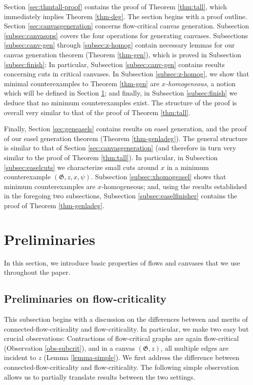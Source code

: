 \documentclass{article}
\newcommand\g{\mathfrak{G}}
\begin{document}
Section \ref{sec:thmtall-proof} contains the proof of Theorem
\ref{thm:tall}, which immediately implies Theorem \ref{thm-deg}. The section
begins with a proof outline. Section \ref{sec:canvasgeneration} concerns
flow-critical canvas generation. Subsection \ref{subsec:canvasops} covers the
four operations for generating canvases.  Subsections \ref{subsec:canv-gen}
through \ref{subsec:z-homog} contain necessary lemmas for our canvas generation
theorem (Theorem \ref{thm-gen}), which is proved in Subsection
\ref{subsec:finish}: In particular, Subsection \ref{subsec:canv-gen} contains
results concerning cuts in critical canvases. In Subsection
\ref{subsec:z-homog}, we show that minimal counterexamples to Theorem
\ref{thm-gen} are \emph{$x$-homogeneous}, a notion which will be defined in
Section \ref{sec:preliminaries}; and finally, in Subsection \ref{subsec:finish}
we deduce that no minimum counterexamples exist. The structure of the proof is
overall very similar to that of the proof of Theorem \ref{thm:tall}. 

Finally,
Section \ref{sec:geneasels} contains results on easel generation, and the proof
of our easel generation theorem (Theorem \ref{thm-genladeg}). The general
structure is similar to that of Section \ref{sec:canvasgeneration} (and
therefore in turn very similar to the proof of Theorem \ref{thm:tall}). In
particular, in Subsection \ref{subsec:easelcuts} we characterize small cuts
around $x$ in a minimum counterexample $(\g,z,x,\psi)$. Subsection
\ref{subsec:xhomogeasel} shows that minimum counterexamples are
$x$-homogeneous; and, using the results established in the foregoing two
subsections, Subsection \ref{subsec:easelfinisher} contains the proof of
Theorem \ref{thm-genladeg}.

\section{Preliminaries}
\label{sec:preliminaries}

In this section, we introduce basic properties of flows and canvases that we use throughout the paper.

\subsection{Preliminaries on flow-criticality}\label{subsec:flow-crit}
This subsection begins with a discussion on the differences between and merits
of connected-flow-criticality and flow-criticality. In particular, we make two
easy but crucial observations: Contractions of flow-critical graphs are again
flow-critical (Observation \ref{obs-subcrit}), and in a canvas $(\g,z)$, all
multiple edges are incident to $z$ (Lemma \ref{lemma-simple}).  We first
address the difference between connected-flow-criticality and flow-criticality.
The following simple observation allows us to partially translate results
between the two settings.
\end{document}
